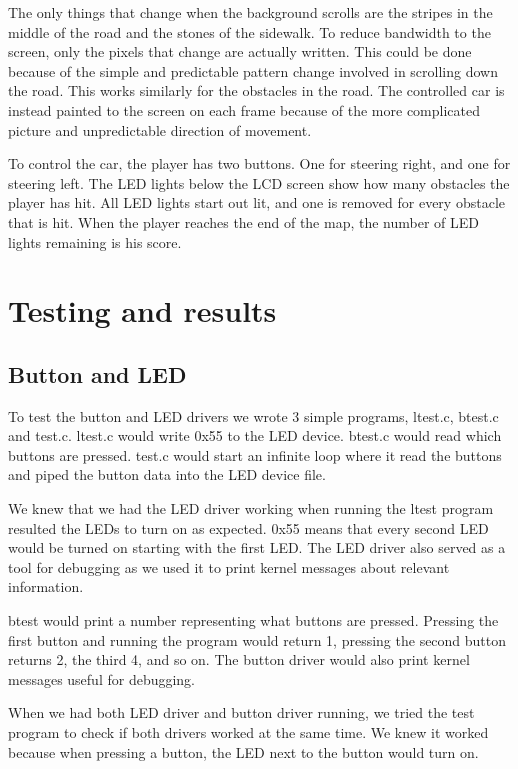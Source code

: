 \documentclass[12pt,a4paper,final]{report}
\numberwithin{equation}{section}
\numberwithin{table}{section}
\numberwithin{figure}{section}
\begin{document}
The only things that change when the background scrolls are the stripes in the middle of the road and the stones of the sidewalk. To reduce bandwidth to the screen, only the pixels that change are actually written. This could be done because of the simple and predictable pattern change involved in scrolling down the road. This works similarly for the obstacles in the road. The controlled car is instead painted to the screen on each frame because of the more complicated picture and unpredictable direction of movement.

To control the car, the player has two buttons. One for steering right, and one for steering left. The LED lights below the LCD screen show how many obstacles the player has hit. All LED lights start out lit, and one is removed for every obstacle that is hit. When the player reaches the end of the map, the number of LED lights remaining is his score.


\newpage

\section{Testing and results}
\label{sec:testresults}

\subsection{Button and LED}
\label{sec:buttonandled}

To test the button and LED drivers we wrote 3 simple programs, ltest.c, btest.c and test.c. ltest.c would write 0x55 to the LED device. btest.c would read which buttons are pressed. test.c would start an infinite loop where it read the buttons and piped the button data into the LED device file.

We knew that we had the LED driver working when running the ltest program resulted the LEDs to turn on as expected. 0x55 means that every second LED would be turned on starting with the first LED. The LED driver also served as a tool for debugging as we used it to print kernel messages about relevant information.

btest would print a number representing what buttons are pressed. Pressing the first button and running the program would return 1, pressing the second button returns 2, the third 4, and so on. The button driver would also print kernel messages useful for debugging.

When we had both LED driver and button driver running, we tried the test program to check if both drivers worked at the same time. We knew it worked because when pressing a button, the LED next to the button would turn on.
\end{document}
